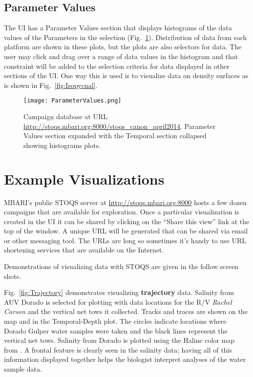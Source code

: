 \documentclass[conference]{IEEEtran}
\begin{document}
\subsection{Parameter Values}

The UI has a Parameter Values section that displays histograms of the data values
of the Parameters in the selection (Fig.~\ref{fig:ParameterValues}). 
Distribution of data from each platform are shown in these plots, 
but the plots are also selectors for data. The user may click and drag over
a range of data values in the histogram and that constraint will be added to the selection criteria
for data displayed in other sections of the UI. One way this is used is to visualize
data on density surfaces as is shown in Fig.~\ref{fig:Isopycnal}.

\begin{figure}[htbp]
\centering
\texttt{[image: ParameterValues.png]}
\caption{Campaign database at URL \url{http://stoqs.mbari.org:8000/stoqs_canon_april2014}. 
Parameter Values section expanded with the Temporal section collapsed 
showing histograms plots.}
\label{fig:ParameterValues}
\end{figure}


\section{Example Visualizations}

MBARI's public STOQS server at \url{http://stoqs.mbari.org:8000} hosts a few dozen 
campaigns that are available for exploration. Once a particular visualization is
created in the UI it can be shared by clicking on the ``Share this view'' link
at the top of the window. A unique URL will be generated that can be shared via 
email or other messaging tool. The URLs are long so sometimes it's handy to use
URL shortening services that are available on the Internet.

Demonstrations of visualizing data with STOQS are given in the follow screen shots.

Fig.~\ref{fig:Trajectory} demonstrates visualizing \textbf{trajectory} data. Salinity from AUV
Dorado is selected for plotting with data locations for the R/V \textit{Rachel Carson} and the vertical net tows it collected.
Tracks and traces are shown on the map and in the Temporal-Depth plot. The circles indicate 
locations where Dorado Gulper water samples were taken and the black lines represent the vertical net tows.
Salinity from Dorado is plotted using the Haline color map from \cite{cmocean}. A frontal feature is clearly seen in 
the salinity data; having all of this information displayed together helps the biologist 
interpret analyses of the water sample data.
\end{document}
